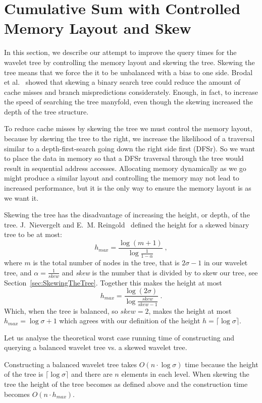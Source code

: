 \section{Cumulative Sum with Controlled Memory Layout and Skew}
\label{sec:memorylayout}
In this section, we describe our attempt to improve the query times for the wavelet tree by controlling the memory layout and skewing the tree.
Skewing the tree means that we force the it to be unbalanced with a bias to one side. 
Brodal et al.~ showed that skewing a binary search tree could reduce the amount of cache misses and branch mispredictions considerately. Enough, in fact, to increase the speed of searching the tree manyfold, even though the skewing increased the depth of the tree structure.

To reduce cache misses by skewing the tree we must control the memory layout, because by skewing the tree to the right, we increase the likelihood of a traversal similar to a depth-first-search going down the right side first (DFSr). So we want to place the data in memory so that a DFSr traversal through the tree would result in sequential address accesses.
Allocating memory dynamically as we go might produce a similar layout and controlling the memory may not lead to increased performance, but it is the only way to ensure the memory layout is as we want it.

Skewing the tree has the disadvantage of increasing the height, or depth, of the tree.
J.~Nievergelt and E.~M. Reingold~ defined the height for a skewed binary tree to be at most:
\[ h_{max} = \frac{\log(m+1)}{ \log\frac{1}{1-\alpha}} \;,\]
where $m$ is the total number of nodes in the tree, that is $2 \sigma - 1$ in our wavelet tree, and $\alpha = \frac{1}{\mathit{skew}}$ and \textit{skew} is the number that is divided by to skew our tree, see Section~\ref{sec:SkewingTheTree}.
Together this makes the height at most
\[ h_{max} = \frac{\log(2 \sigma)}{ \log\frac{\mathit{skew}}{\mathit{skew} - 1}}  \;.\]
Which, when the tree is balanced, so $\mathit{skew} = 2$, makes the height at most $h_{max} = \log \sigma + 1$ which agrees with our definition of the height $h = \lceil \log \sigma \rceil$.

Let us analyse the theoretical worst case running time of constructing and querying a balanced wavelet tree vs. a skewed wavelet tree.

Constructing a balanced wavelet tree takes  $O(n \cdot \log \sigma)$ time because the height of the tree is $\lceil \log \sigma \rceil$ and there are $n$ elements in each level.
When skewing the tree the height of the tree becomes as defined above and the construction time becomes $O(n \cdot h_{max})$.

